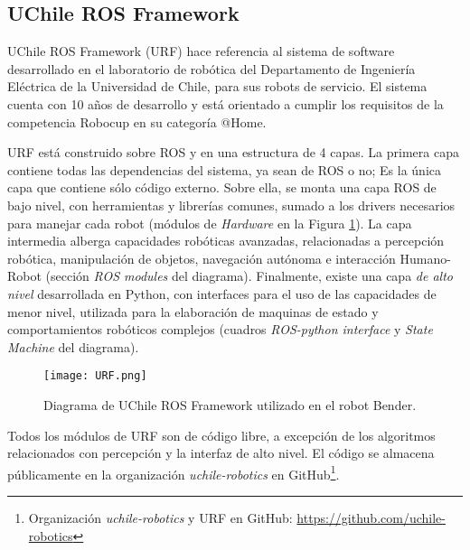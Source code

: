 \subsection{UChile ROS Framework}

UChile ROS Framework (URF) hace referencia al sistema de software desarrollado en el laboratorio de robótica del Departamento de Ingeniería Eléctrica de la Universidad de Chile, para sus robots de servicio. El sistema cuenta con 10 años de desarrollo y está orientado a cumplir los requisitos de la competencia Robocup en su categoría @Home.

URF está construido sobre ROS y en una estructura de 4 capas. La primera capa contiene todas las dependencias del sistema, ya sean de ROS o no; Es la única capa que contiene sólo código externo. Sobre ella, se monta una capa ROS de bajo nivel, con herramientas y librerías comunes, sumado a los drivers necesarios para manejar cada robot (módulos de \textit{Hardware} en la Figura \ref{img:URF}). La capa intermedia alberga capacidades robóticas avanzadas, relacionadas a percepción robótica, manipulación de objetos, navegación autónoma e interacción Humano-Robot (sección \textit{ROS modules} del diagrama). Finalmente, existe una capa \textit{de alto nivel} desarrollada en Python, con interfaces para el uso de las capacidades de menor nivel, utilizada para la elaboración de maquinas de estado y comportamientos robóticos complejos (cuadros \textit{ROS-python interface} y \textit{State Machine} del diagrama).

\begin{figure}[H]
	\centering
	\texttt{[image: URF.png]}
	\caption{\small Diagrama de UChile ROS Framework utilizado en el robot Bender.}
	\label{img:URF}
\end{figure}

Todos los módulos de URF son de código libre, a excepción de los algoritmos relacionados con percepción y la interfaz de alto nivel. El código se almacena públicamente en la organización \textit{uchile-robotics} en GitHub\footnote{Organización \textit{uchile-robotics} y URF en GitHub: \url{https://github.com/uchile-robotics}}.




